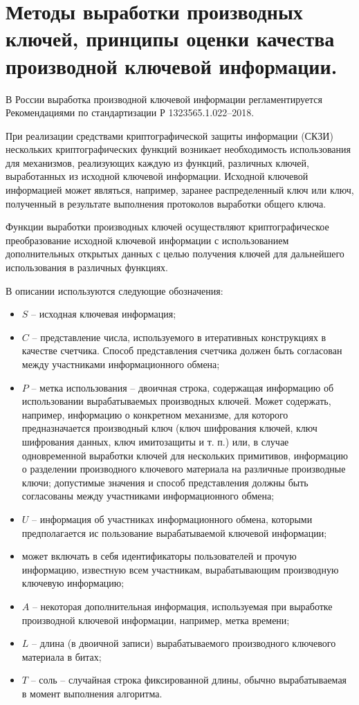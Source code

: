\section{Методы выработки производных ключей, принципы оценки качества производной ключевой информации.}

В России выработка производной ключевой информации регламентируется Рекомендациями по стандартизации Р 1323565.1.022--2018.

При реализации средствами криптографической защиты информации (СКЗИ) нескольких криптографических функций возникает необходимость использования для механизмов, реализующих каждую из функций, различных ключей, выработанных из исходной ключевой информации. Исходной ключевой информацией может являться, например, заранее распределенный ключ или ключ, полученный в результате выполнения протоколов выработки общего ключа.

Функции выработки производных ключей осуществляют криптографическое преобразование исходной ключевой информации с использованием дополнительных открытых данных с целью получения
ключей для дальнейшего использования в различных функциях.

В описании используются следующие обозначения:

\begin{itemize}
	\item $S$ -- исходная ключевая информация;
	\item $C$ -- представление числа, используемого в итеративных конструкциях в качестве счетчика. Способ представления счетчика должен быть согласован между участниками информационного обмена;
	\item $P$ -- метка использования -- двоичная строка, содержащая информацию об использовании вырабатываемых производных ключей. Может содержать, например, информацию о конкретном механизме, для которого предназначается производный ключ (ключ шифрования ключей, ключ шифрования данных, ключ имитозащиты и т. п.) или, в случае одновременной выработки ключей для нескольких примитивов, информацию о разделении производного ключевого материала на различные производные ключи; допустимые значения и способ представления должны быть согласованы между участниками информационного обмена;
	\item $U$ -- информация об участниках информационного обмена, которыми предполагается ис пользование вырабатываемой ключевой информации;
	\item может включать в себя идентификаторы пользователей и прочую информацию, известную всем участникам, вырабатывающим производную ключевую информацию;
	\item $A$ -- некоторая дополнительная информация, используемая при выработке производной ключевой информации, например, метка времени;
	\item $L$ -- длина (в двоичной записи) вырабатываемого производного ключевого материала в битах;
	\item $T$ -- соль -- случайная строка фиксированной длины, обычно вырабатываемая в момент выполнения алгоритма.
\end{itemize}

